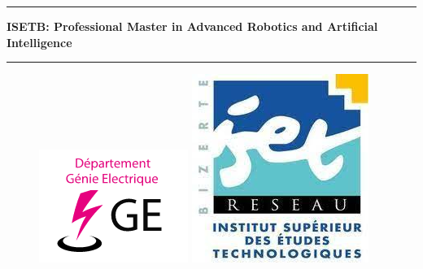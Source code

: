 \documentclass{article}
\begin{document}
\hrule
\vspace*{1cm}
\centering
\Large \textbf{ISETB: Professional Master in Advanced Robotics and Artificial Intelligence}
\vspace*{1cm}
\hrule

\begin{figure}[h]
    \begin{minipage}[h]{0.2\textwidth}
        \raggedright     %
        \includegraphics[width=\textwidth]{logo.jpg}
    \end{minipage}
    \hspace*{0.6\textwidth}
    \begin{minipage}[h]{0.2\textwidth}
        \raggedleft %
        \includegraphics[width=\textwidth]{logo_iset.jpg}
    \end{minipage}
\end{figure}
\vspace*{2cm}
\end{document}
